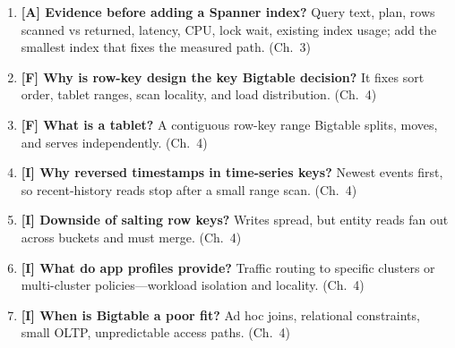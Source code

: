 \begin{enumerate}
    strong consistency versus asynchronous read copies of a primary. (Ch.~3)
    \item \textbf{[A] Evidence before adding a Spanner index?} Query text, plan, rows scanned vs
    returned, latency, CPU, lock wait, existing index usage; add the smallest index that fixes the
    measured path. (Ch.~3)
    \item \textbf{[F] Why is row-key design the key Bigtable decision?} It fixes sort order, tablet
    ranges, scan locality, and load distribution. (Ch.~4)
    \item \textbf{[F] What is a tablet?} A contiguous row-key range Bigtable splits, moves, and
    serves independently. (Ch.~4)
    \item \textbf{[I] Why reversed timestamps in time-series keys?} Newest events first, so
    recent-history reads stop after a small range scan. (Ch.~4)
    \item \textbf{[I] Downside of salting row keys?} Writes spread, but entity reads fan out
    across buckets and must merge. (Ch.~4)
    \item \textbf{[I] What do app profiles provide?} Traffic routing to specific clusters or
    multi-cluster policies---workload isolation and locality. (Ch.~4)
    \item \textbf{[I] When is Bigtable a poor fit?} Ad hoc joins, relational constraints, small
    OLTP, unpredictable access paths. (Ch.~4)
\end{enumerate}

